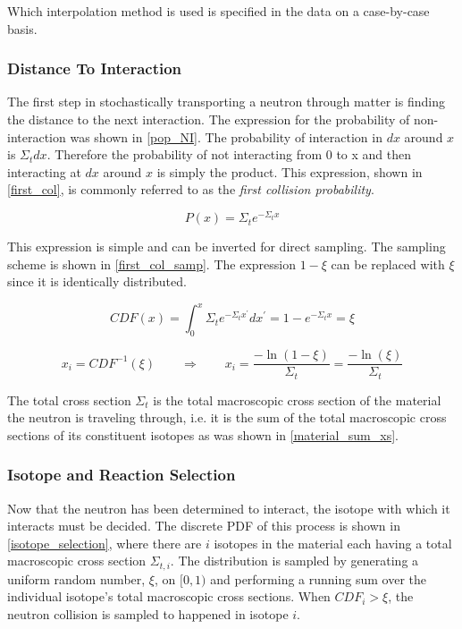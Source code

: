 Which interpolation method is used is specified in the data on a case-by-case basis.

\subsubsection{Distance To Interaction}

The first step in stochastically transporting a neutron through matter is finding the distance to the next interaction.  The expression for the probability of non-interaction was shown in \eqref{pop_NI}.  The probability of interaction in $dx$ around $x$ is $\Sigma_t dx$.  Therefore the probability of not interacting from 0 to x and then interacting at $dx$ around $x$ is simply the product.  This expression, shown in \eqref{first_col}, is commonly referred to as the \emph{first collision probability}.

\begin{equation}
\label{first_col}
P(x) = \Sigma_t e^{- \Sigma_t  x}
\end{equation}

This expression is simple and can be inverted for direct sampling.  The sampling scheme is shown in \eqref{first_col_samp}.  The expression $1-\xi$ can be replaced with $\xi$ since it is identically distributed.

\begin{equation}
\label{first_col}
CDF(x) = \int_0^x \Sigma_t e^{- \Sigma_t  x^\prime} dx^\prime = 1- e^{- \Sigma_t  x} = \xi
\end{equation}

\begin{equation}
\label{first_col_samp}
x_i=CDF^{-1}(\xi) \qquad \Rightarrow \qquad x_i=\frac{-\ln(1-\xi) }{\Sigma_t}=\frac{-\ln(\xi) }{\Sigma_t}
\end{equation}

The total cross section $\Sigma_t$ is the total macroscopic cross section of the material the neutron is traveling through, i.e. it is the sum of the total macroscopic cross sections of its constituent isotopes as was shown in \eqref{material_sum_xs}.

\subsubsection{Isotope and Reaction Selection}

Now that the neutron has been determined to interact, the isotope with which it interacts must be decided.  The discrete PDF of this process is shown in \eqref{isotope_selection}, where there are $i$ isotopes in the material each having a total macroscopic cross section $\Sigma_{t,i}$.  The distribution is sampled by generating a uniform random number, $\xi$, on $[0,1)$ and performing a running sum over the individual isotope's total macroscopic cross sections.  When $CDF_i > \xi$, the neutron collision is sampled to happened in isotope $i$.


